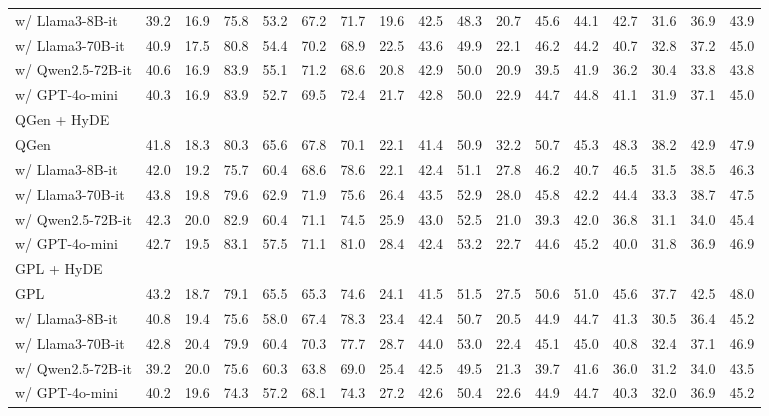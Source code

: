 \begin{table*}[ht]
{\begin{tabular}{l|ccccccccc|cccccc|c}
        w/ Llama3-8B-it & 39.2 & 16.9 & 75.8 & 53.2 & 67.2 & 71.7 & 19.6 & 42.5 & 48.3 & 20.7 & 45.6 & 44.1 & 42.7 & 31.6 & 36.9 & 43.9 \\
        w/ Llama3-70B-it & 40.9 & 17.5 & 80.8 & 54.4 & 70.2 & 68.9 & 22.5 & 43.6 & 49.9 & 22.1 & 46.2 & 44.2 & 40.7 & 32.8 & 37.2 & 45.0 \\
        w/ Qwen2.5-72B-it & 40.6 & 16.9 & 83.9 & 55.1 & 71.2 & 68.6 & 20.8 & 42.9 & 50.0 & 20.9 & 39.5 & 41.9 & 36.2 & 30.4 & 33.8 & 43.8 \\
        w/ GPT-4o-mini & 40.3 & 16.9 & 83.9 & 52.7 & 69.5 & 72.4 & 21.7 & 42.8 & 50.0 & 22.9 & 44.7 & 44.8 & 41.1 & 31.9 & 37.1 & 45.0 \\
        \midrule
        \multicolumn{17}{l}{QGen + HyDE} \\
        QGen & 41.8 & 18.3 & 80.3 & 65.6 & 67.8 & 70.1 & 22.1 & 41.4 & 50.9 & 32.2 & 50.7 & 45.3 & 48.3 & 38.2 & 42.9 & 47.9 \\
        w/ Llama3-8B-it & 42.0 & 19.2 & 75.7 & 60.4 & 68.6 & 78.6 & 22.1 & 42.4 & 51.1 & 27.8 & 46.2 & 40.7 & 46.5 & 31.5 & 38.5 & 46.3 \\
        w/ Llama3-70B-it & 43.8 & 19.8 & 79.6 & 62.9 & 71.9 & 75.6 & 26.4 & 43.5 & 52.9 & 28.0 & 45.8 & 42.2 & 44.4 & 33.3 & 38.7 & 47.5 \\
        w/ Qwen2.5-72B-it & 42.3 & 20.0 & 82.9 & 60.4 & 71.1 & 74.5 & 25.9 & 43.0 & 52.5 & 21.0  & 39.3 & 42.0  & 36.8 & 31.1 & 34.0 & 45.4 \\
        w/ GPT-4o-mini & 42.7 & 19.5 & 83.1 & 57.5 & 71.1 & 81.0 & 28.4 & 42.4 & 53.2 & 22.7 & 44.6 & 45.2 & 40.0 & 31.8 & 36.9 & 46.9 \\
        \midrule
        \multicolumn{17}{l}{GPL + HyDE} \\
        GPL & 43.2 & 18.7 & 79.1 & 65.5 & 65.3 & 74.6 & 24.1 & 41.5 & 51.5 & 27.5 & 50.6 & 51.0 & 45.6 & 37.7 & 42.5 & 48.0 \\
        w/ Llama3-8B-it & 40.8 & 19.4 & 75.6 & 58.0 & 67.4 & 78.3 & 23.4 & 42.4 & 50.7 & 20.5 & 44.9 & 44.7 & 41.3 & 30.5 & 36.4 & 45.2 \\
        w/ Llama3-70B-it & 42.8 & 20.4 & 79.9 & 60.4 & 70.3 & 77.7 & 28.7 & 44.0 & 53.0 & 22.4 & 45.1 & 45.0 & 40.8 & 32.4 & 37.1 & 46.9 \\
        w/ Qwen2.5-72B-it & 39.2 & 20.0 & 75.6 & 60.3 & 63.8 & 69.0 & 25.4 & 42.5 & 49.5 & 21.3 & 39.7 & 41.6 & 36.0 & 31.2 & 34.0 & 43.5 \\
        w/ GPT-4o-mini & 40.2 & 19.6 & 74.3 & 57.2 & 68.1 & 74.3 & 27.2 & 42.6 & 50.4 & 22.6 & 44.9 & 44.7 & 40.3 & 32.0 & 36.9 & 45.2 \\

\end{tabular}}
\end{table*}
